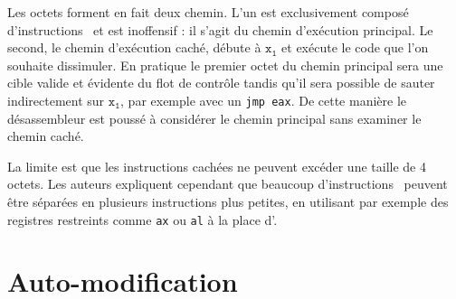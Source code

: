 Les octets forment en fait deux chemin. L'un est exclusivement composé d'instructions \nop\ et est inoffensif : il s'agit du chemin d'exécution principal. Le second, le chemin d'exécution caché, débute à $\mathtt{x_1}$ et exécute le code que l'on souhaite dissimuler. En pratique le premier octet du chemin principal sera une cible valide et évidente du flot de contrôle tandis qu'il sera possible de sauter indirectement sur $\mathtt{x_1}$, par exemple avec un \texttt{jmp eax}. De cette manière le désassembleur est poussé à considérer le chemin principal sans examiner le chemin caché.

La limite est que les instructions cachées ne peuvent excéder une taille de 4 octets. Les auteurs expliquent cependant que beaucoup d'instructions \xq\ peuvent être séparées en plusieurs instructions plus petites, en utilisant par exemple des registres restreints comme \texttt{ax} ou \texttt{al} à la place d'\eax.

\section{Auto-modification}


